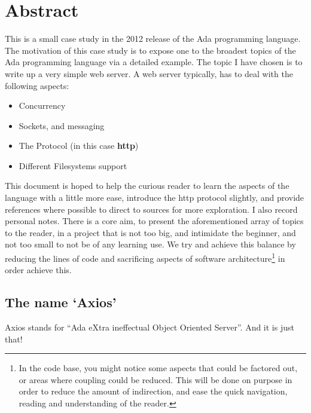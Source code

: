 \section{Abstract} 
This is a small case study in the 2012 release of the Ada programming language. The motivation of this case study is to expose one to the broadest topics of the Ada programming language via a detailed example. The topic I have chosen is to write up a very simple web server. A web server typically, has to deal with the following aspects:
\begin{itemize}
\item Concurrency
\item Sockets, and messaging
\item The Protocol (in this case \textbf{http})
\item Different Filesystems support
\end{itemize} 
This document is hoped to help the curious reader to learn the aspects of the language with a little more ease, introduce the http protocol slightly, and provide references where possible to direct to sources for more exploration. I also record personal notes. 
There is a core aim, to present the aforementioned array of topics to the reader, in a project that is not too big, and intimidate the beginner, and not too small to not be of any learning use. We try and achieve this balance by reducing the lines of code and sacrificing aspects of software architecture\footnote{In the code base, you might notice some aspects that could be factored out, or areas where coupling could be reduced. This will be done on purpose in order to reduce the amount of indirection, and ease the quick navigation, reading and understanding of the reader.} in order achieve this.

\subsection{The name `Axios'}
Axios stands for ``Ada eXtra ineffectual Object Oriented Server''. And it is just that!

